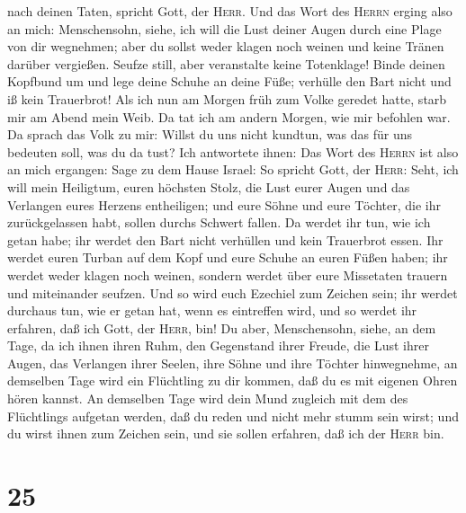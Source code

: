 nach deinen Taten, spricht Gott, der \textsc{Herr}.  Und
das Wort des \textsc{Herrn} erging also an mich: 
Menschensohn, siehe, ich will die Lust deiner Augen durch eine Plage von
dir wegnehmen; aber du sollst weder klagen noch weinen und keine Tränen
darüber vergießen.  Seufze still, aber veranstalte keine
Totenklage! Binde deinen Kopfbund um und lege deine Schuhe an deine
Füße; verhülle den Bart nicht und iß kein Trauerbrot! 
Als ich nun am Morgen früh zum Volke geredet hatte, starb mir am Abend
mein Weib. Da tat ich am andern Morgen, wie mir befohlen war.
 Da sprach das Volk zu mir: Willst du uns nicht kundtun,
was das für uns bedeuten soll, was du da tust?  Ich
antwortete ihnen: Das Wort des \textsc{Herrn} ist also an mich ergangen:
Sage zu dem Hause Israel:  So spricht Gott, der
\textsc{Herr}: Seht, ich will mein Heiligtum, euren höchsten Stolz, die
Lust eurer Augen und das Verlangen eures Herzens entheiligen; und eure
Söhne und eure Töchter, die ihr zurückgelassen habt, sollen durchs
Schwert fallen.  Da werdet ihr tun, wie ich getan habe;
ihr werdet den Bart nicht verhüllen und kein Trauerbrot essen.
 Ihr werdet euren Turban auf dem Kopf und eure Schuhe an
euren Füßen haben; ihr werdet weder klagen noch weinen, sondern werdet
über eure Missetaten trauern und miteinander seufzen. 
Und so wird euch Ezechiel zum Zeichen sein; ihr werdet durchaus tun, wie
er getan hat, wenn es eintreffen wird, und so werdet ihr erfahren, daß
ich Gott, der \textsc{Herr}, bin!  Du aber, Menschensohn,
siehe, an dem Tage, da ich ihnen ihren Ruhm, den Gegenstand ihrer
Freude, die Lust ihrer Augen, das Verlangen ihrer Seelen, ihre Söhne und
ihre Töchter hinwegnehme,  an demselben Tage wird ein
Flüchtling zu dir kommen, daß du es mit eigenen Ohren hören kannst.
 An demselben Tage wird dein Mund zugleich mit dem des
Flüchtlings aufgetan werden, daß du reden und nicht mehr stumm sein
wirst; und du wirst ihnen zum Zeichen sein, und sie sollen erfahren, daß
ich der \textsc{Herr} bin.

\hypertarget{section-24}{%
\section{25}\label{section-24}}

